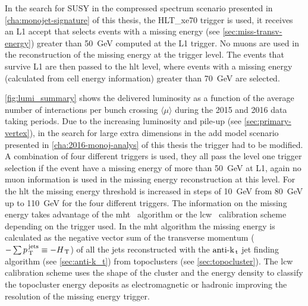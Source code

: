 In the search for SUSY in the compressed spectrum scenario presented in
\cref{cha:monojet-signature} of this thesis, the HLT\_xe70 trigger is used, it
receives an L1 accept that selects events with a missing energy (see
\cref{sec:miss-transv-energy}) greater than 50~GeV computed at the L1 trigger.
No muons are used in the reconstruction of the missing energy at the trigger
level. The events that survive L1 are then passed to the \gls{hlt} level, where
events with a missing energy (calculated from cell energy information) greater
than 70~GeV are selected.

\cref{fig:lumi_summary} shows the delivered luminosity as a function of the
average number of interactions per bunch crossing $\langle \mu \rangle$ during
the 2015 and 2016 data taking periods. Due to the increasing luminosity and
pile-up (see \cref{sec:primary-vertex}), in the search for large extra
dimensions in the \gls{add} model scenario presented in
\ref{cha:2016-monoj-analys} of this thesis the trigger had to be modified. A
combination of four different triggers is used, they all pass the level one
trigger selection if the event have a missing energy of more than 50~GeV at L1,
again no muon information is used in the missing energy reconstruction at this
level. For the \gls{hlt} the missing energy threshold is increased in steps of
10~GeV from 80~GeV up to 110~GeV for the four different triggers. The
information on the missing energy takes advantage of the
\gls{mht}~\cite{MHTAlgorithm} algorithm or the \gls{lcw}~\cite{LCWCalibration}
calibration scheme depending on the trigger used. In the \gls{mht} algorithm the
missing energy is calculated as the negative vector sum of the transverse
momentum ($- \sum p_\mathrm{\, T}^\mathrm{\, jets} \equiv - H_\mathrm{\, T}$) of all the
jets reconstructed with the $\text{anti-k}_\mathrm{\, t}$ jet finding algorithm (see
\cref{sec:anti-k_t}) from topoclusters (see \cref{sec:topocluster}). The
\gls{lcw} calibration scheme uses the shape of the cluster and the energy
density to classify the topocluster energy deposits as electromagnetic or
hadronic improving the resolution of the missing energy trigger.

